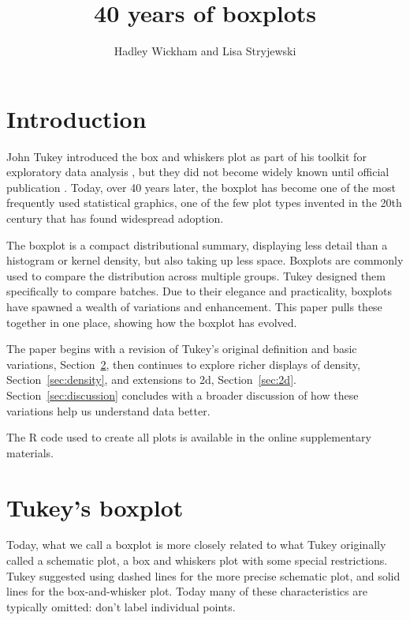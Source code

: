 \documentclass[oneside]{article}
\title{40 years of boxplots}
\author{Hadley Wickham and Lisa Stryjewski}
\begin{document}
\maketitle 

\section{Introduction}

\citep[pg. 164]{spear:1952}

John Tukey introduced the box and whiskers plot as part of his toolkit for  exploratory data analysis \citep{tukey:1970}, but they did not become widely known until official publication \citep{EDA}. Today, over 40 years later, the boxplot has become one of the most frequently used statistical graphics, one of the few plot types invented in the 20th century that has found widespread adoption. 

The boxplot is a compact distributional summary, displaying less detail than a histogram or kernel density, but also taking up less space. Boxplots are commonly used to compare the distribution across multiple groups. Tukey designed them specifically to compare batches. Due to their elegance and practicality, boxplots have spawned a wealth of variations and enhancement. This paper pulls these together in one place, showing how the boxplot has evolved.

The paper begins with a revision of Tukey's original definition and basic variations, Section~\ref{sec:tukey}, then continues to explore richer displays of density, Section~\ref{sec:density}, and extensions to 2d, Section~\ref{sec:2d}. Section~\ref{sec:discussion} concludes with a broader discussion of how these variations help us understand data better.

The R code used to create all plots is available in the online supplementary materials.

\section{Tukey's boxplot}
\label{sec:tukey}

Today, what we call a boxplot is more closely related to what Tukey originally called a schematic plot, a box and whiskers plot with some special restrictions. Tukey suggested using dashed lines for the more precise schematic plot, and solid lines for the box-and-whisker plot. Today many of these characteristics are typically omitted: don't label individual points.
\end{document}
